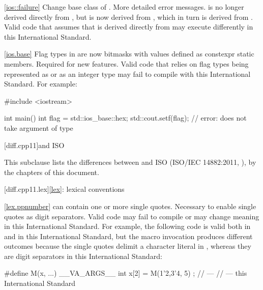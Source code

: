 \ref{ios::failure}
\change Change base class of .
\rationale More detailed error messages.
\effect
{} is no longer derived directly from
, but is now derived from ,
which in turn is derived from . Valid \CppIII code
that assumes that  is derived directly from
 may execute differently in this International Standard.

\ref{ios.base}
\change Flag types in  are now bitmasks with values
defined as constexpr static members.
\rationale Required for new features.
\effect
Valid \CppIII code that relies on  flag types being
represented as  or as an integer type may fail to compile
with this International Standard. For example:

\begin{codeblock}
#include <iostream>

int main() {
  int flag = std::ios_base::hex;
  std::cout.setf(flag);         // error:  does not take argument of type 
}
\end{codeblock}

[diff.cpp11]{\Cpp and ISO \CppXI}

\pnum
{}%
This subclause lists the differences between \Cpp and
ISO \CppXI (ISO/IEC 14882:2011, ),
by the chapters of this document.

[diff.cpp11.lex]{\ref{lex}: lexical conventions}

\ref{lex.ppnumber}
\change {} can contain one or more single quotes.
\rationale Necessary to enable single quotes as digit separators.
\effect Valid \CppXI code may fail to compile or may change meaning in this
International Standard. For example, the following code is valid both in \CppXI and in
this International Standard, but the macro invocation produces different outcomes
because the single quotes delimit a character literal in \CppXI, whereas they are digit
separators in this International Standard:

\begin{codeblock}
#define M(x, ...) __VA_ARGS__
int x[2] = { M(1'2,3'4, 5) };
//  --- \CppXI
//  --- this International Standard
\end{codeblock}

